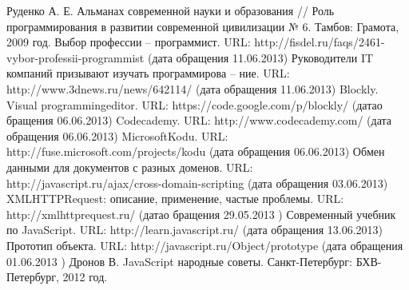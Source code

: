 
\begin{thebibliography}{99}
	Руденко А. Е. Альманах современной науки и образования // Роль программирования в развитии современной цивилизации № 6. Тамбов: Грамота, 2009 год.
	Выбор профессии – программист. URL: http://fisdel.ru/faqs/2461-vybor-professii-programmist (дата обращения 11.06.2013)
	Руководители IT компаний призывают изучать программирова – ние. URL: http://www.3dnews.ru/news/642114/ (дата обращения 11.06.2013)
	Blockly. Visual programmingeditor. URL: https://code.google.com/p/blockly/ (датао бращения 06.06.2013)
	Codecademy. URL: http://www.codecademy.com/ (дата обращения 06.06.2013)
	MicrosoftKodu. URL: http://fuse.microsoft.com/projects/kodu (дата обращения 06.06.2013)
	Обмен данными для документов с разных доменов. URL: http://javascript.ru/ajax/cross-domain-scripting  (дата обращения 03.06.2013)
	XMLHTTPRequest: описание, применение, частые проблемы. URL: http://xmlhttprequest.ru/ (датао бращения 29.05.2013 )
	Современный учебник по JavaScript. URL: http://learn.javascript.ru/ (дата обращения  13.06.2013)
	Прототип объекта. URL: http://javascript.ru/Object/prototype (дата обращения 01.06.2013 )
	Дронов В. JavaScript народные советы. Санкт-Петербург: БХВ-Петербург, 2012 год.


\end{thebibliography}

